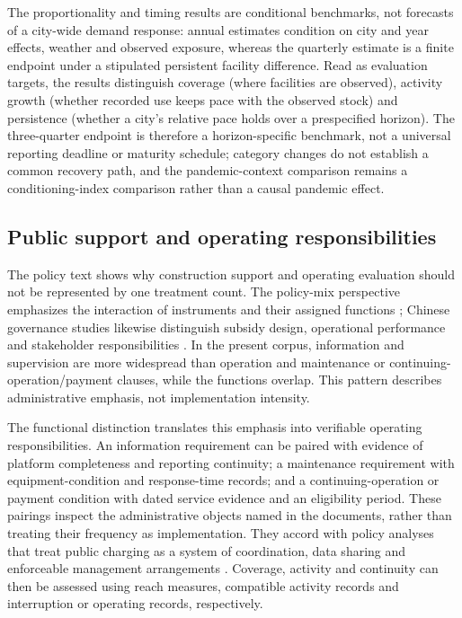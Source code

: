 The proportionality and timing results are conditional benchmarks, not forecasts of a city-wide demand response: annual estimates condition on city and year effects, weather and observed exposure, whereas the quarterly estimate is a finite endpoint under a stipulated persistent facility difference. Read as evaluation targets, the results distinguish coverage (where facilities are observed), activity growth (whether recorded use keeps pace with the observed stock) and persistence (whether a city's relative pace holds over a prespecified horizon). The three-quarter endpoint is therefore a horizon-specific benchmark, not a universal reporting deadline or maturity schedule; category changes do not establish a common recovery path, and the pandemic-context comparison remains a conditioning-index comparison rather than a causal pandemic effect.

\subsection{Public support and operating responsibilities}
The policy text shows why construction support and operating evaluation should not be represented by one treatment count. The policy-mix perspective emphasizes the interaction of instruments and their assigned functions \citep{rogge2016}; Chinese governance studies likewise distinguish subsidy design, operational performance and stakeholder responsibilities \citep{hu2026,zhang2024}. In the present corpus, information and supervision are more widespread than operation and maintenance or continuing-operation/payment clauses, while the functions overlap. This pattern describes administrative emphasis, not implementation intensity.

The functional distinction translates this emphasis into verifiable operating responsibilities. An information requirement can be paired with evidence of platform completeness and reporting continuity; a maintenance requirement with equipment-condition and response-time records; and a continuing-operation or payment condition with dated service evidence and an eligibility period. These pairings inspect the administrative objects named in the documents, rather than treating their frequency as implementation. They accord with policy analyses that treat public charging as a system of coordination, data sharing and enforceable management arrangements \citep{tilly2025}. Coverage, activity and continuity can then be assessed using reach measures, compatible activity records and interruption or operating records, respectively.

